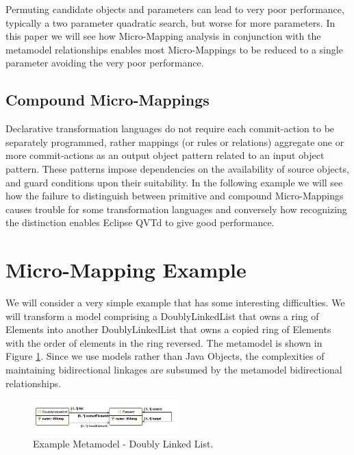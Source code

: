\documentclass[conference]{IEEEtran}
\begin{document}
Permuting candidate objects and parameters can lead to very poor performance, typically a two parameter quadratic search, but worse for more parameters. In this paper we will see how Micro-Mapping analysis in conjunction with the metamodel relationships enables most Micro-Mappings to be reduced to a single parameter avoiding the very poor performance. %

\subsection{Compound Micro-Mappings}

Declarative transformation languages do not require each commit-action to be separately programmed, rather mappings (or rules or relations) aggregate one or more commit-actions as an output object pattern related to an input object pattern. These patterns impose dependencies on the availability of source objects, and guard conditions upon their suitability. In the following example we will see how the failure to distinguish between primitive and compound Micro-Mappings causes trouble for some transformation languages and conversely how recognizing the distinction enables Eclipse QVTd to give good performance.

\section{Micro-Mapping Example}\label{Micro-Mapping Example}

We will consider a very simple example that has some interesting difficulties. We will transform a model comprising a DoublyLinkedList that owns a ring of Elements into another DoublyLinkedList that owns a copied ring of Elements with the order of elements in the ring reversed. The metamodel is shown in Figure \ref{fig:DoublyLinkedListMM}. Since we use models rather than Java Objects, the complexities of maintaining bidirectional linkages are subsumed by the metamodel bidirectional relationships.

\begin{figure}[h]
	\centering
	\includegraphics[width=0.5\textwidth]{doublylinkedlist.png}
	\caption{Example Metamodel - Doubly Linked List.}
	\label{fig:DoublyLinkedListMM}
\end{figure}
\end{document}
